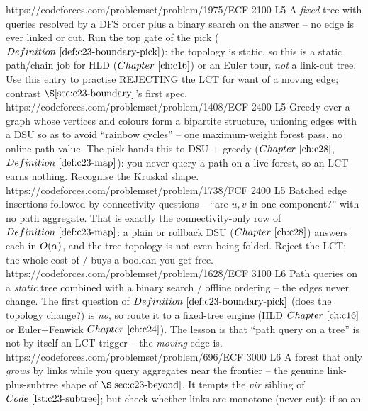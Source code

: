 \begin{mixedset}
    {https://codeforces.com/problemset/problem/1975/E}{CF 2100 L5}
    {A \emph{fixed} tree with queries resolved by a DFS order plus a binary search on the answer --
     no edge is ever linked or cut. Run the top gate of the pick (\(\defref{c23-boundary-pick}\)):
     the topology is static, so this is a static path/chain job for HLD (\(\chref{c16}\)) or an
     Euler tour, \emph{not} a link-cut tree. Use this entry to practise REJECTING the LCT for want
     of a moving edge; contrast \(\secref{c23-boundary}\)'s first spec.}
    {https://codeforces.com/problemset/problem/1408/E}{CF 2400 L5}
    {Greedy over a graph whose vertices and colours form a bipartite structure, unioning edges with a
     DSU so as to avoid ``rainbow cycles'' -- one maximum-weight forest pass, no online path value.
     The pick hands this to DSU + greedy (\(\chref{c28}\), \(\defref{c23-map}\)): you never query a
     path on a live forest, so an LCT earns nothing. Recognise the Kruskal shape.}
    {https://codeforces.com/problemset/problem/1738/F}{CF 2400 L5}
    {Batched edge insertions followed by connectivity questions -- ``are \(u,v\) in one component?''
     with no path aggregate. That is exactly the connectivity-only row of \(\defref{c23-map}\): a
     plain or rollback DSU (\(\chref{c28}\)) answers each in \(O(\alpha)\), and the tree topology
     is not even being folded. Reject the LCT; the whole cost of / buys a
     boolean you get free.}
    {https://codeforces.com/problemset/problem/1628/E}{CF 3100 L6}
    {Path queries on a \emph{static} tree combined with a binary search / offline ordering -- the
     edges never change. The first question of \(\defref{c23-boundary-pick}\) (does the topology
     change?) is \emph{no}, so route it to a fixed-tree engine (HLD \(\chref{c16}\) or
     Euler+Fenwick \(\chref{c24}\)). The lesson is that ``path query on a tree'' is not by itself an
     LCT trigger -- the \emph{moving} edge is.}
    {https://codeforces.com/problemset/problem/696/E}{CF 3000 L6}
    {A forest that only \emph{grows} by links while you query aggregates near the frontier -- the
     genuine link-plus-subtree shape of \(\secref{c23-beyond}\). It tempts the \(\mathit{vir}\)
     sibling of \(\coderef{c23-subtree}\); but check whether links are monotone (never cut): if so an
}
\end{mixedset}
